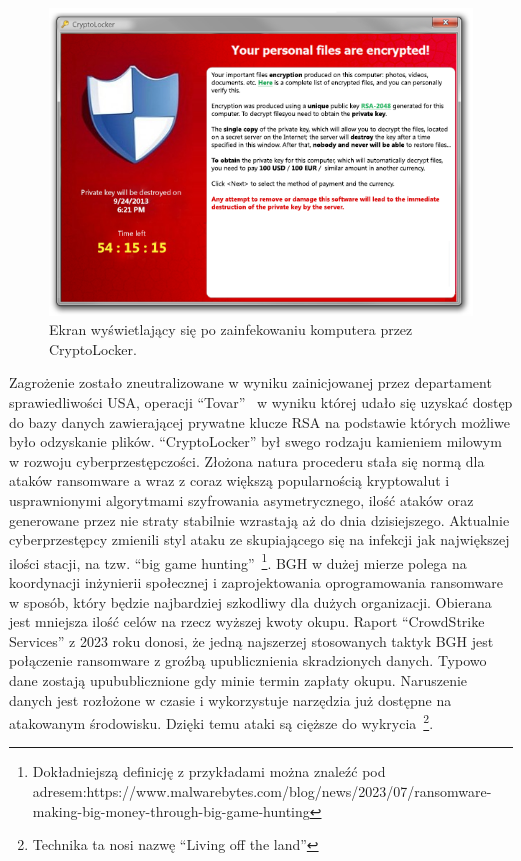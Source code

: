 \begin{figure}
    \centering
    \includegraphics[width=0.75\linewidth]{rysunki/cryptolocker.png}
    \caption{Ekran wyświetlający się po zainfekowaniu komputera przez CryptoLocker.}
    \label{fig:enter-label}
\end{figure}
Zagrożenie zostało zneutralizowane w wyniku zainicjowanej przez departament sprawiedliwości USA, operacji \foreignquote{english}{Tovar}~\cite{tovar} w wyniku której udało się uzyskać dostęp do bazy danych zawierającej prywatne klucze RSA na podstawie których możliwe było odzyskanie plików.
\newline
\foreignquote{english}{CryptoLocker} był swego rodzaju kamieniem milowym w rozwoju cyberprzestępczości. Złożona natura procederu stała się normą dla ataków ransomware a wraz z coraz większą popularnością kryptowalut i usprawnionymi algorytmami szyfrowania asymetrycznego, ilość ataków oraz generowane przez nie straty stabilnie wzrastają aż do dnia dzisiejszego.
\newline
Aktualnie cyberprzestępcy zmienili styl ataku ze skupiającego się na infekcji jak największej ilości stacji, na tzw. \foreignquote{english}{big game hunting}~\footnote{Dokładniejszą definicję z przykładami można znaleźć pod adresem:\newline https://www.malwarebytes.com/blog/news/2023/07/ransomware-making-big-money-through-big-game-hunting}. BGH w dużej mierze polega na koordynacji inżynierii społecznej i zaprojektowania oprogramowania ransomware w sposób, który będzie najbardziej szkodliwy dla dużych organizacji. Obierana jest mniejsza ilość celów na rzecz wyższej kwoty okupu. Raport \foreignquote{english}{CrowdStrike Services} z 2023 roku donosi, że jedną najszerzej stosowanych taktyk BGH jest połączenie ransomware z groźbą upublicznienia skradzionych danych. Typowo dane zostają upubublicznione gdy minie termin zapłaty okupu. Naruszenie danych jest rozłożone w czasie i wykorzystuje narzędzia już dostępne na atakowanym środowisku. Dzięki temu ataki są cięższe do wykrycia~\footnote{Technika ta nosi nazwę \foreignquote{english}{Living off the land}}.
